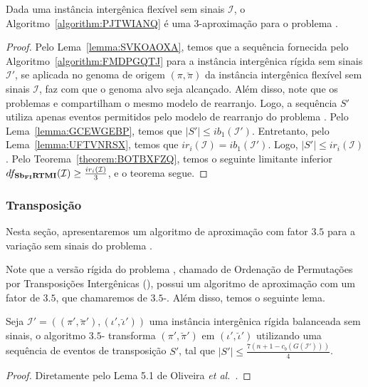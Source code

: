 \begin{theorem}\label{theorem:TYVMEDAI}
Dada uma instância intergênica flexível sem sinais $\mathcal{I}$, o Algoritmo~\ref{algorithm:PJTWIANQ} é uma $3$-aproximação para o problema \SbFIRTMI{}.
\end{theorem}
\begin{proof}
Pelo Lema~\ref{lemma:SVKOAOXA}, temos que a sequência fornecida pelo Algoritmo~\ref{algorithm:FMDPGQTJ} para a instância intergênica rígida sem sinais $\mathcal{I'}$, se aplicada no genoma de origem $(\pi,\breve\pi)$ da instância intergênica flexível sem sinais $\mathcal{I}$, faz com que o genoma alvo seja alcançado. Além disso, note que os problemas \SbIRTMI{} e \SbFIRTMI{} compartilham o mesmo modelo de rearranjo. Logo, a sequência $S'$ utiliza apenas eventos permitidos pelo modelo de rearranjo do problema \SbFIRTMI{}. Pelo Lema~\ref{lemma:GCEWGEBP}, temos que $|S'| \le ib_1(\mathcal{I}')$. Entretanto, pelo Lema~\ref{lemma:UFTVNRSX}, temos que $ir_i(\mathcal{I}) = ib_1(\mathcal{I'})$. Logo, $|S'| \le ir_i(\mathcal{I})$. Pelo Teorema~\ref{theorem:BOTBXFZQ}, temos o seguinte limitante inferior $df_{\textbf{Sb\textsubscript{FI}RTMI}}(\mathcal{I}) \ge \frac{ir_i(\mathcal{I})}{3}$, e o teorema segue.
\end{proof}

\subsubsection{Transposição}

Nesta seção, apresentaremos um algoritmo de aproximação com fator $3.5$ para a variação sem sinais do problema \SbFIT{}. 

Note que a versão rígida do problema \SbFIT{}, chamado de Ordenação de Permutações por Transposições Intergênicas (\SbIT), possui um algoritmo de aproximação com um fator de $3.5$, que chamaremos de $3.5$-\SbIT{}. Além disso, temos o seguinte lema.

\begin{lemma}\label{lemma:EIGSYNDP}
Seja $\mathcal{I}' = ((\pi',\breve\pi'),(\iota',\breve\iota'))$ uma instância intergênica rígida balanceada sem sinais, o algoritmo $3.5$-\SbIT{} transforma $(\pi',\breve\pi')$ em $(\iota',\breve\iota')$ utilizando uma sequência de eventos de transposição $S'$, tal que $|S'| \le \frac{7({n+1} - c_b(G(\mathcal{I}')))}{4}$.
\end{lemma}
\begin{proof}
Diretamente pelo Lema 5.1 de Oliveira \textit{et al.}~\cite{2021a-oliveira-etal}.
\end{proof}

